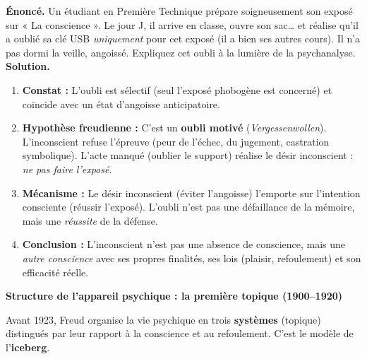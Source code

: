 \documentclass[11pt]{article}
\begin{document}
\begin{exoresolu}
\textbf{Énoncé.} Un étudiant en Première Technique prépare soigneusement son exposé sur « La conscience ». Le jour J, il arrive en classe, ouvre son sac… et réalise qu'il a oublié sa clé USB \emph{uniquement} pour cet exposé (il a bien ses autres cours). Il n'a pas dormi la veille, angoissé. Expliquez cet oubli à la lumière de la psychanalyse.
\tcblower
\textbf{Solution.}
\begin{enumerate}
    \item \textbf{Constat :} L'oubli est sélectif (seul l'exposé phobogène est concerné) et coïncide avec un état d'angoisse anticipatoire.
    \item \textbf{Hypothèse freudienne :} C'est un \textbf{oubli motivé} (\emph{Vergessenwollen}). L'inconscient refuse l'épreuve (peur de l'échec, du jugement, castration symbolique). L'acte manqué (oublier le support) réalise le désir inconscient : \emph{ne pas faire l'exposé}.
    \item \textbf{Mécanisme :} Le désir inconscient (éviter l'angoisse) l'emporte sur l'intention consciente (réussir l'exposé). L'oubli n'est pas une défaillance de la mémoire, mais une \emph{réussite} de la défense.
    \item \textbf{Conclusion :} L'inconscient n'est pas une absence de conscience, mais une \emph{autre conscience} avec ses propres finalités, ses lois (plaisir, refoulement) et son efficacité réelle.
\end{enumerate}
\end{exoresolu}

\textbf{Structure de l'appareil psychique : la première topique (1900–1920)}\par

Avant 1923, Freud organise la vie psychique en trois \textbf{systèmes} (topique) distingués par leur rapport à la conscience et au refoulement. C'est le modèle de l'\textbf{iceberg}.
\end{document}
